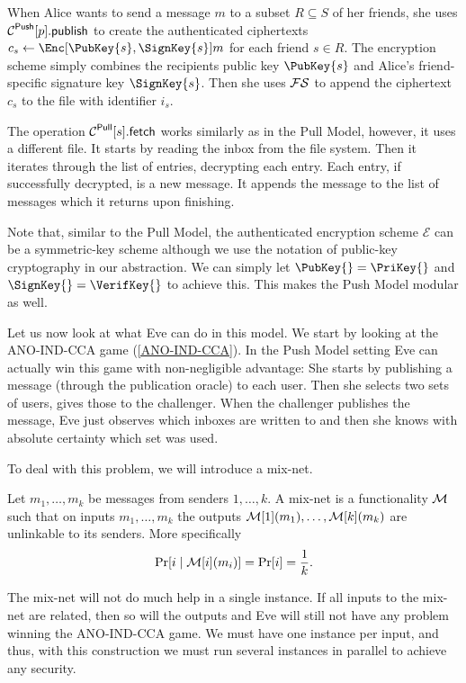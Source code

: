 When Alice wants to send a message \(m\) to a subset \(R\subseteq S\) of her 
friends, she uses \(\pnpub{p}\) to create the authenticated ciphertexts 
\(c_s\gets \Enc[\PubKey{s}, \SignKey{s}]{m}\) for each friend \(s\in R\).
The encryption scheme simply combines the recipients public key \(\PubKey{s}\) 
and Alice's friend-specific signature key \(\SignKey{s}\).
Then she uses \(\FS\) to append the ciphertext \(c_s\) to the file with 
identifier \(i_s\).

The operation \(\pget{s}\) works similarly as in the Pull Model, however, it 
uses a different file.
It starts by reading the inbox from the file system.
Then it iterates through the list of entries, decrypting each entry.
Each entry, if successfully decrypted, is a new message.
It appends the message to the list of messages which it returns upon 
finishing.

Note that, similar to the Pull Model, the authenticated encryption scheme 
\(\mathcal{E}\) can be a symmetric-key scheme although we use the notation of 
public-key cryptography in our abstraction.
We can simply let \(\PubKey{} = \PriKey{}\) and \(\SignKey{} = \VerifKey{}\) to 
achieve this.
This makes the Push Model modular as well.

Let us now look at what Eve can do in this model.
We start by looking at the ANO-IND-CCA game (\cref{ANO-IND-CCA}).
In the Push Model setting Eve can actually win this game with non-negligible 
advantage:
She starts by publishing a message (through the publication oracle) to each 
user.
Then she selects two sets of users, gives those to the challenger.
When the challenger publishes the message, Eve just observes which inboxes are 
written to and then she knows with absolute certainty which set was used.

To deal with this problem, we will introduce a mix-net.

\begin{definition}\label{MixNet}
  Let \(m_1, \ldots, m_k\) be messages from senders \(1, \ldots, k\).
  A mix-net is a functionality \(\operatorname{\mathcal{M}}\) such that on inputs \(m_1, \ldots, m_k\) 
  the outputs \(\operatorname{\mathcal{M}}[1](m_1), \ldots, \operatorname{\mathcal{M}}[k](m_k)\) are unlinkable to its senders.
  More specifically
  \begin{equation*}
    \Pr[i\mid \operatorname{\mathcal{M}}[i](m_i)] = \Pr[i] = \frac{1}{k}.
  \end{equation*}
\end{definition}

The mix-net will not do much help in a single instance.
If all inputs to the mix-net are related, then so will the outputs and Eve will 
still not have any problem winning the ANO-IND-CCA game.
We must have one instance per input, and thus, with this construction we must 
run several instances in parallel to achieve any security.

